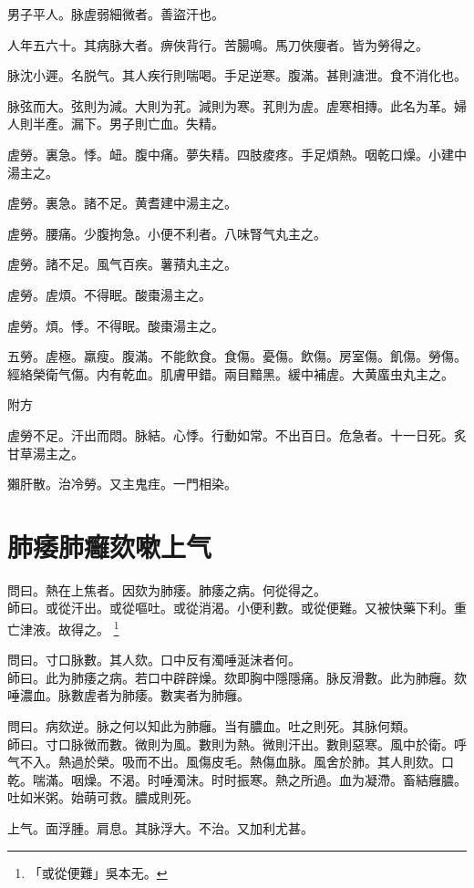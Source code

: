 男子平人。脉虗弱細微者。善盜汗也。

人年五六十。其病脉大者。痹俠背行。苦腸鳴。馬刀俠癭者。皆为勞得之。

脉沈小遲。名脱气。其人疾行則喘喝。手足逆寒。腹滿。甚則溏泄。食不消化也。

脉弦而大。弦則为減。大則为芤。減則为寒。芤則为虗。虗寒相摶。此名为革。婦人則半產。漏下。男子則亡血。失精。

虗勞。裏急。悸。衄。腹中痛。夢失精。四肢痠疼。手足煩熱。咽乾口燥。小建中湯主之。

虗勞。裏急。諸不足。黄耆建中湯主之。

虗勞。腰痛。少腹拘急。小便不利者。八味腎气丸主之。

虗勞。諸不足。風气百疾。薯蕷丸主之。

虗勞。虗煩。不得眠。酸棗湯主之。

虗勞。煩。悸。不得眠。酸棗湯主之。{\qianjin}

五勞。虗極。羸瘦。腹滿。不能飲食。食傷。憂傷。飲傷。房室傷。飢傷。勞傷。經絡榮衛气傷。内有乾血。肌膚甲錯。兩目黯黑。緩中補虗。大黄䗪虫丸主之。

附方

虗勞不足。汗出而悶。脉結。心悸。行動如常。不出百日。危急者。十一日死。炙甘草湯主之。

獺肝散。治冷勞。又主鬼疰。一門相染。

\chapter{肺痿肺癰欬嗽上气}

問曰。熱在上焦者。因欬为肺痿。肺痿之病。何從得之。\\
師曰。或從汗出。或從嘔吐。或從消渴。小便利數。{\khaaitp 或從便難。}又被快藥下利。重亡津液。故得之。
	\footnote{「或從便難」吳本无。}

問曰。寸口脉數。其人欬。口中反有濁唾涎沫者何。\\
師曰。{\khaaitp 此}为肺痿之病。若口中辟辟燥。欬即胸中隱隱痛。脉反滑數。此为肺癰。欬唾濃血。脉數虗者为肺痿。數実者为肺癰。

問曰。病欬逆。脉之何以知此为肺癰。当有膿血。吐之則死。其脉何類。\\
師曰。寸口脉微而數。微則为風。數則为熱。微則汗出。數則惡寒。風中於衛。呼气不入。熱過於榮。吸而不出。風傷皮毛。熱傷血脉。風舍於肺。其人則欬。口乾。喘滿。咽燥。不渴。时唾濁沫。时时振寒。熱之所過。血为凝滯。畜結癰膿。吐如米粥。始萌可救。膿成則死。

上气。面浮腫。肩息。其脉浮大。不治。又加利尤甚。

